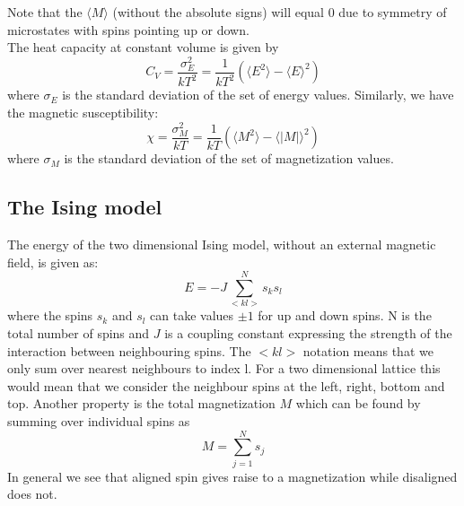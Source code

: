 \documentclass[%
 reprint,
nofootinbib,
aps,
]{revtex4-1}
\begin{document}
Note that the $\langle M\rangle$ (without the absolute signs) will equal 0 due to symmetry of microstates with spins pointing up or down.\\ 
The heat capacity at constant volume is given by
\begin{equation}
    C_V = \frac{\sigma_E^2}{k T^2} = \frac{1}{k T^2} (\langle E^2 \rangle - \langle E \rangle^2)
    \label{eq:C_V_num}
\end{equation}
where $\sigma_E$ is the standard deviation of the set of energy values. Similarly, we have the magnetic susceptibility:
\begin{equation}
    \chi = \frac{\sigma_M^2}{k T} = \frac{1}{k T} (\langle M^2 \rangle - \langle |M| \rangle^2)
    \label{eq:chi_num}
\end{equation}
where $\sigma_M$ is the standard deviation of the set of magnetization values.

\subsection{The Ising model}
The energy of the two dimensional Ising model, without an external magnetic field, is given as:
\begin{equation}
    E = -J \sum_{<kl>}^N s_ks_l
    \label{eq:Ising_energy}
\end{equation}
where the spins $s_k$ and $s_l$ can take values $\pm1$ for up and down spins. N is the total number of spins and $J$ is a coupling constant expressing the strength of the interaction between neighbouring spins. The $<kl>$ notation means that we only sum over nearest neighbours to index l. For a two dimensional lattice this would mean that we consider the neighbour spins at the left, right, bottom and top. Another property is the total magnetization $M$ which can be found by summing over individual spins as 
\begin{equation}
    M = \sum_{j=1}^N s_j
    \label{eq:Ising_magnetization}
\end{equation}
In general we see that aligned spin gives raise to a magnetization while disaligned does not. 
\end{document}

